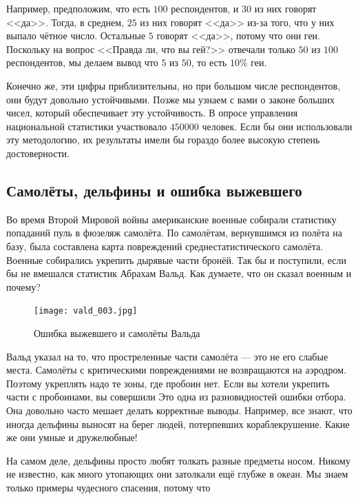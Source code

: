 \documentclass[12pt, a4paper, oneside]{article}
\begin{document}
Например, предположим, что есть $100$ респондентов, и $30$ из них говорят <<да>>. Тогда, в среднем, $25$ из них говорят <<да>> из-за того, что у них выпало чётное число. Остальные $5$ говорят <<да>>, потому что они геи.  Поскольку на вопрос <<Правда ли, что вы гей?>> отвечали только $50$ из $100$ респондентов, мы делаем вывод что $5$ из $50$, то есть $10\%$ геи.  

Конечно же, эти цифры приблизительны, но при большом числе респондентов, они будут довольно устойчивыми. Позже мы узнаем с вами о законе больших чисел, который обеспечивает эту устойчивость. В опросе управления национальной статистики участвовало $450 000$ человек. Если бы они использовали эту методологию, их результаты имели бы гораздо более высокую степень достоверности.


\subsection{Самолёты, дельфины и ошибка выжевшего}

Во время Второй Мировой войны американские военные собирали статистику попаданий пуль в фюзеляж самолёта. По самолётам, вернувшимся из полёта на базу, была составлена карта повреждений среднестатистического самолёта.  Военные собирались укрепить дырявые части бронёй. Так бы и поступили, если бы не вмешался статистик  Абрахам Вальд. Как думаете, что он сказал военным и почему? 


\begin{figure}[H]
\begin{center}
\texttt{[image: vald\_003.jpg]}
\caption{Ошибка выжевшего и самолёты Вальда} \label{fig:plane}
\end{center}
\end{figure}

Вальд указал на то, что простреленные части самолёта --- это не его слабые места. Самолёты с критическими повреждениями не возвращаются на аэродром. Поэтому укреплять надо те зоны, где пробоин нет. Если вы хотели укрепить части с пробоинами, вы совершили  Это одна из разновидностей ошибки отбора. Она довольно часто мешает делать корректные выводы. Например, все знают, что иногда дельфины выносят на берег людей, потерпевших кораблекрушение. Какие же они умные и дружелюбные! 

На самом деле, дельфины просто любят толкать разные предметы носом. Никому не известно, как много утопающих они затолкали ещё глубже в океан. Мы знаем только примеры чудесного спасения, потому что 
\end{document}
